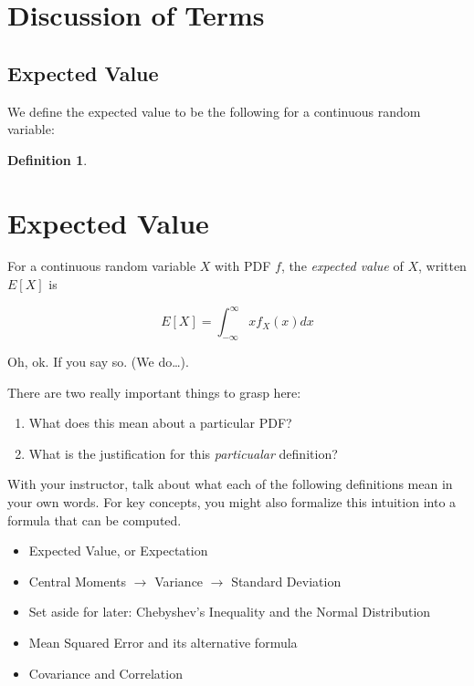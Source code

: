 \documentclass[
]{book}
\providecommand{\tightlist}{%
  \setlength{\itemsep}{0pt}\setlength{\parskip}{0pt}}
\theoremstyle{definition}
\newtheorem{definition}{Definition}[chapter]
\theoremstyle{definition}
\theoremstyle{definition}
\theoremstyle{definition}
\theoremstyle{remark}
\begin{document}
\section{Discussion of Terms}\label{discussion-of-terms}

\subsection{Expected Value}\label{expected-value}

We define the expected value to be the following for a continuous random variable:

\begin{definition}
\leavevmode

\section{Expected Value}\label{expected-value-1}

For a continuous random variable \(X\) with PDF \(f\), the \emph{expected value} of \(X\), written \(E[X]\) is

\[
E[X] = \int_{-\infty}^{\infty}xf_{X}(x) dx
\]

\end{definition}

Oh, ok. If you say so. (We do\ldots).

There are two really important things to grasp here:

\begin{enumerate}
\def\labelenumi{\arabic{enumi}.}
\tightlist
\item
  What does this mean about a particular PDF?
\item
  What is the justification for this \emph{particualar} definition?
\end{enumerate}

With your instructor, talk about what each of the following definitions mean in your own words. For key concepts, you might also formalize this intuition into a formula that can be computed.

\begin{itemize}
\tightlist
\item
  Expected Value, or Expectation
\item
  Central Moments \(\rightarrow\) Variance \(\rightarrow\) Standard Deviation
\item
  Set aside for later: Chebyshev's Inequality and the Normal Distribution
\item
  Mean Squared Error and its alternative formula
\item
  Covariance and Correlation
\end{itemize}
\end{document}
